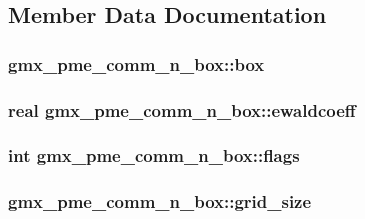 \subsection{\-Member \-Data \-Documentation}
\hypertarget{structgmx__pme__comm__n__box_aeadb88e7e84b9ae8c0ffc1c5af9e2d50}{
\subsubsection[{box}]{ {\bf gmx\-\_\-pme\-\_\-comm\-\_\-n\-\_\-box\-::box}}}\label{structgmx__pme__comm__n__box_aeadb88e7e84b9ae8c0ffc1c5af9e2d50}
\hypertarget{structgmx__pme__comm__n__box_aa1873db58b59fcdf9982ee5e91aa30ba}{
\subsubsection[{ewaldcoeff}]{\setlength{\rightskip}{0pt plus 5cm}real {\bf gmx\-\_\-pme\-\_\-comm\-\_\-n\-\_\-box\-::ewaldcoeff}}}\label{structgmx__pme__comm__n__box_aa1873db58b59fcdf9982ee5e91aa30ba}
\hypertarget{structgmx__pme__comm__n__box_add61ee7d34ab5eb0c425aff8fe172d1b}{
\subsubsection[{flags}]{\setlength{\rightskip}{0pt plus 5cm}int {\bf gmx\-\_\-pme\-\_\-comm\-\_\-n\-\_\-box\-::flags}}}\label{structgmx__pme__comm__n__box_add61ee7d34ab5eb0c425aff8fe172d1b}
\hypertarget{structgmx__pme__comm__n__box_af27110459981ea30163adfce49b836dd}{
\subsubsection[{grid\-\_\-size}]{ {\bf gmx\-\_\-pme\-\_\-comm\-\_\-n\-\_\-box\-::grid\-\_\-size}}}\label{structgmx__pme__comm__n__box_af27110459981ea30163adfce49b836dd}
